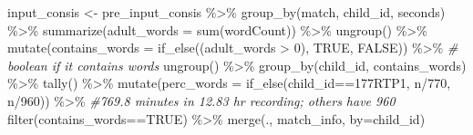 \documentclass[
]{article}
\newenvironment{Shaded}{\begin{snugshade}}{\end{snugshade}}
\newcommand{\AttributeTok}[1]{\textcolor[rgb]{0.77,0.63,0.00}{#1}}
\newcommand{\CommentTok}[1]{\textcolor[rgb]{0.56,0.35,0.01}{\textit{#1}}}
\newcommand{\DecValTok}[1]{\textcolor[rgb]{0.00,0.00,0.81}{#1}}
\newcommand{\FunctionTok}[1]{\textcolor[rgb]{0.00,0.00,0.00}{#1}}
\newcommand{\NormalTok}[1]{#1}
\newcommand{\OtherTok}[1]{\textcolor[rgb]{0.56,0.35,0.01}{#1}}
\newcommand{\SpecialCharTok}[1]{\textcolor[rgb]{0.00,0.00,0.00}{#1}}
\newcommand{\StringTok}[1]{\textcolor[rgb]{0.31,0.60,0.02}{#1}}
\begin{document}
\begin{Shaded}
\begin{Highlighting}[]
\NormalTok{input\_consis }\OtherTok{\textless{}{-}}\NormalTok{ pre\_input\_consis }\SpecialCharTok{\%\textgreater{}\%}
  \FunctionTok{group\_by}\NormalTok{(match, child\_id, seconds) }\SpecialCharTok{\%\textgreater{}\%}
  \FunctionTok{summarize}\NormalTok{(}\AttributeTok{adult\_words =} \FunctionTok{sum}\NormalTok{(wordCount)) }\SpecialCharTok{\%\textgreater{}\%}
  \FunctionTok{ungroup}\NormalTok{() }\SpecialCharTok{\%\textgreater{}\%}
  \FunctionTok{mutate}\NormalTok{(}\AttributeTok{contains\_words =} \FunctionTok{if\_else}\NormalTok{((adult\_words }\SpecialCharTok{\textgreater{}} \DecValTok{0}\NormalTok{), }\StringTok{\textquotesingle{}TRUE\textquotesingle{}}\NormalTok{, }\StringTok{\textquotesingle{}FALSE\textquotesingle{}}\NormalTok{)) }\SpecialCharTok{\%\textgreater{}\%} \CommentTok{\# boolean if it contains words}
  \FunctionTok{ungroup}\NormalTok{() }\SpecialCharTok{\%\textgreater{}\%}
  \FunctionTok{group\_by}\NormalTok{(child\_id, contains\_words) }\SpecialCharTok{\%\textgreater{}\%}
  \FunctionTok{tally}\NormalTok{() }\SpecialCharTok{\%\textgreater{}\%}
  \FunctionTok{mutate}\NormalTok{(}\AttributeTok{perc\_words =} \FunctionTok{if\_else}\NormalTok{(child\_id}\SpecialCharTok{==}\StringTok{\textquotesingle{}177RTP1\textquotesingle{}}\NormalTok{, n}\SpecialCharTok{/}\DecValTok{770}\NormalTok{, n}\SpecialCharTok{/}\DecValTok{960}\NormalTok{)) }\SpecialCharTok{\%\textgreater{}\%} \CommentTok{\#769.8 minutes in 12.83 hr recording; others have 960}
  \FunctionTok{filter}\NormalTok{(contains\_words}\SpecialCharTok{==}\StringTok{\textquotesingle{}TRUE\textquotesingle{}}\NormalTok{) }\SpecialCharTok{\%\textgreater{}\%}
  \FunctionTok{merge}\NormalTok{(., match\_info, }\AttributeTok{by=}\StringTok{\textquotesingle{}child\_id\textquotesingle{}}\NormalTok{) }


\end{Highlighting}
\end{Shaded}
\end{document}
